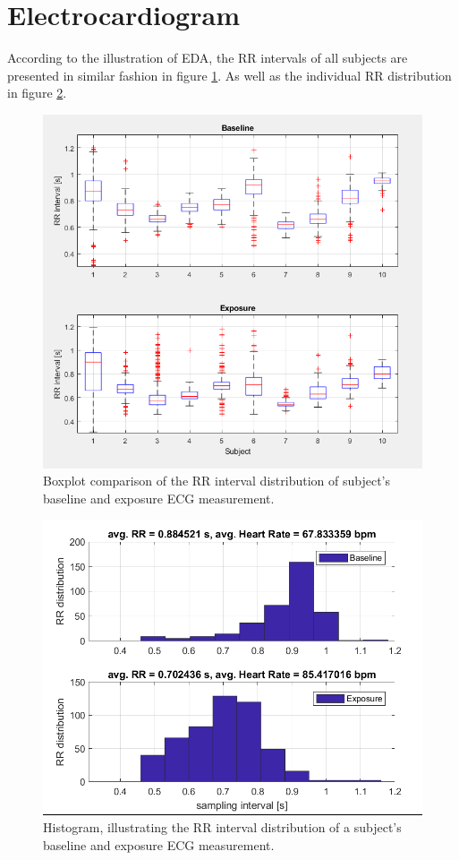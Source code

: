 \newpage
\section{Electrocardiogram}
According to the illustration of EDA, the RR intervals of all subjects are presented in similar fashion in figure \ref{ECGbpImg}. As well as the individual RR distribution in figure \ref{ECGhistoImg}.

\begin{figure}[h]
\centering
\includegraphics[width=1\textwidth]{images/ECGRRp.png}
\caption{Boxplot comparison of the RR interval distribution of subject's baseline and exposure ECG measurement.}
\label{ECGbpImg}
\end{figure}


\begin{figure}[h]
\centering
\includegraphics[width=1\textwidth]{images/ECGhisto.png}
\caption{Histogram, illustrating the RR interval distribution of a subject's baseline and exposure ECG measurement.}
\label{ECGhistoImg}
\end{figure}

